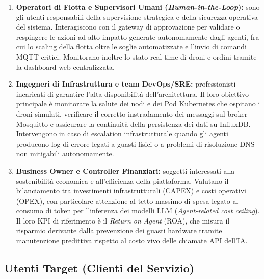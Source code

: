 \begin{enumerate}
    \item \textbf{Operatori di Flotta e Supervisori Umani (\textit{Human-in-the-Loop}):}
    sono gli utenti responsabili della supervisione strategica e della sicurezza operativa del sistema. Interagiscono con il gateway di approvazione per validare o respingere le azioni ad alto impatto generate autonomamente dagli agenti, fra cui lo scaling della flotta oltre le soglie automatizzate e l'invio di comandi MQTT critici. Monitorano inoltre lo stato real-time di droni e ordini tramite la dashboard web centralizzata.

    \item \textbf{Ingegneri di Infrastruttura e team DevOps/SRE:}
    professionisti incaricati di garantire l'alta disponibilità dell'architettura. Il loro obiettivo principale è monitorare la salute dei nodi e dei Pod Kubernetes che ospitano i droni simulati, verificare il corretto instradamento dei messaggi sul broker Mosquitto e assicurare la continuità della persistenza dei dati su InfluxDB. Intervengono in caso di escalation infrastrutturale quando gli agenti producono log di errore legati a guasti fisici o a problemi di risoluzione DNS non mitigabili autonomamente.

    \item \textbf{Business Owner e Controller Finanziari:}
    soggetti interessati alla sostenibilità economica e all'efficienza della piattaforma. Valutano il bilanciamento tra investimenti infrastrutturali (CAPEX) e costi operativi (OPEX), con particolare attenzione al tetto massimo di spesa legato al consumo di token per l'inferenza dei modelli LLM (\textit{Agent-related cost ceiling}). Il loro KPI di riferimento è il \textit{Return on Agent} (ROA), che misura il risparmio derivante dalla prevenzione dei guasti hardware tramite manutenzione predittiva rispetto al costo vivo delle chiamate API dell'IA.
\end{enumerate}

\subsection*{Utenti Target (Clienti del Servizio)}

